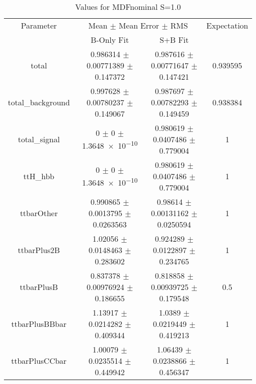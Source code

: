 \begin{table}
\centering
\caption{Values for MDFnominal S=1.0}
\begin{tabular}{cccc}
\toprule
Parameter & \multicolumn{2}{c}{Mean $\pm$ Mean Error $\pm$ RMS} & Expectation\\
 & B-Only Fit & S+B Fit & \\
\midrule
total & \num{0.986314} $\pm$ \num{0.00771389} $\pm$ \num{0.147372} & \num{0.987616} $\pm$ \num{0.00771647} $\pm$ \num{0.147421} & \num{0.939595}\\
total\_background & \num{0.997628} $\pm$ \num{0.00780237} $\pm$ \num{0.149067} & \num{0.987697} $\pm$ \num{0.00782293} $\pm$ \num{0.149459} & \num{0.938384}\\
total\_signal & \num{0} $\pm$ \num{0} $\pm$ \num{1.3648e-10} & \num{0.980619} $\pm$ \num{0.0407486} $\pm$ \num{0.779004} & \num{1}\\
ttH\_hbb & \num{0} $\pm$ \num{0} $\pm$ \num{1.3648e-10} & \num{0.980619} $\pm$ \num{0.0407486} $\pm$ \num{0.779004} & \num{1}\\
ttbarOther & \num{0.990865} $\pm$ \num{0.0013795} $\pm$ \num{0.0263563} & \num{0.98614} $\pm$ \num{0.00131162} $\pm$ \num{0.0250594} & \num{1}\\
ttbarPlus2B & \num{1.02056} $\pm$ \num{0.0148463} $\pm$ \num{0.283602} & \num{0.924289} $\pm$ \num{0.0122897} $\pm$ \num{0.234765} & \num{1}\\
ttbarPlusB & \num{0.837378} $\pm$ \num{0.00976924} $\pm$ \num{0.186655} & \num{0.818858} $\pm$ \num{0.00939725} $\pm$ \num{0.179548} & \num{0.5}\\
ttbarPlusBBbar & \num{1.13917} $\pm$ \num{0.0214282} $\pm$ \num{0.409344} & \num{1.0389} $\pm$ \num{0.0219449} $\pm$ \num{0.419213} & \num{1}\\
ttbarPlusCCbar & \num{1.00079} $\pm$ \num{0.0235514} $\pm$ \num{0.449942} & \num{1.06439} $\pm$ \num{0.0238866} $\pm$ \num{0.456347} & \num{1}\\
\bottomrule
\end{tabular}
\end{table}